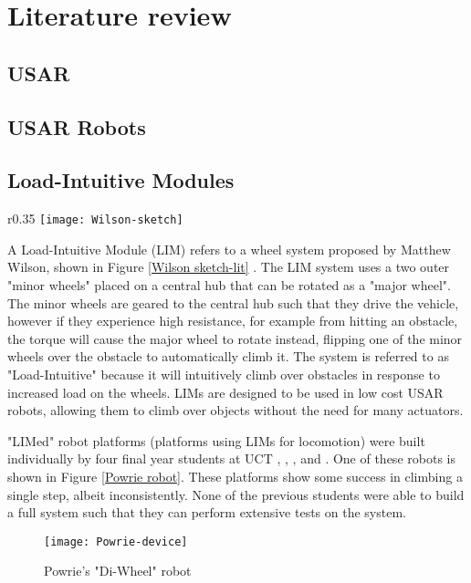  \chapter{Literature review}

\section{USAR}

\section{USAR Robots}

\section{Load-Intuitive Modules}

\begin{wrapfigure}{r}{0.35\textwidth} %
	\centering
	\texttt{[image: Wilson-sketch]}
	\caption{Systems layout of Wilson's LIM device \citep{Wilson-2013}}
	\label{Wilson sketch-lit}
\end{wrapfigure}

A Load-Intuitive Module (LIM) refers to a wheel system proposed by Matthew Wilson, shown in Figure \ref{Wilson sketch-lit} \citep{Wilson-2013}. The LIM system uses a two outer "minor wheels" placed on a central hub that can be rotated as a "major wheel". The minor wheels are geared to the central hub such that they drive the vehicle, however if they experience high resistance, for example from hitting an obstacle, the torque will cause the major wheel to rotate instead, flipping one of the minor wheels over the obstacle to automatically climb it. The system is referred to as "Load-Intuitive" because it will intuitively climb over obstacles in response to increased load on the wheels. LIMs are designed to be used in low cost USAR robots, allowing them to climb over objects without the need for many actuators.

\noindent "LIMed" robot platforms (platforms using LIMs for locomotion) were built individually by four final year students at UCT \citep{Wilson-2013},  \citep{Haskel-2017}, \citep{Buchanan-2018}, and \citep{Powrie-2019-lit}. One of these robots is shown in Figure \ref{Powrie robot}. These platforms show some success in climbing a single step, albeit inconsistently. None of the previous students were able to build a full system such that they can perform extensive tests on the system.


\begin{figure}[h]
	\centering
	\texttt{[image: Powrie-device]}
	\caption{Powrie's "Di-Wheel" robot \citep{Powrie-2019}}
	\label{Powrie robot-lit}
\end{figure}
